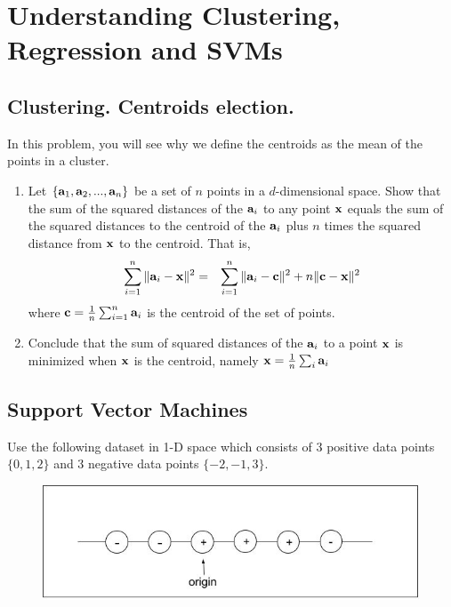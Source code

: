 \section{Understanding Clustering, Regression and SVMs}


\subsection{Clustering. Centroids election.}

In this problem, you will see why we define the centroids as the mean of the points in a cluster.

\begin{enumerate}
    \item Let $\{ {\bf a}_1, {\bf a}_2, ... , {\bf a}_n \}$ be a set of $n$ points in a $d$-dimensional space. Show that the sum of the squared distances of the ${\bf a}_i$ to any point ${\bf x}$ equals the sum of the squared distances to the centroid of the ${\bf a}_i$ plus $n$ times the squared distance from ${\bf x}$ to the centroid. That is,
\begin{eqnarray}
\sum_{i = 1}^n \| {\bf a}_i - {\bf x}\|^2 & = & \sum_{i=1}^{ n} \| {\bf a}_i - {\bf c}\|^2 +  n \| {\bf c} - {\bf x}\|^2
\end{eqnarray}
where ${\bf c} = \frac{1}{ n} \sum_{i=1}^n {\bf a}_i$ is the centroid of the set of points.

\item Conclude that the sum of squared distances of the ${\bf a}_i$ to a point ${\bf x}$ is minimized when ${\bf x}$ is the centroid, namely ${\bf x} = \frac{1}{n} \sum_{i} {\bf a}_i$

\end{enumerate}

\subsection{Support Vector Machines}

Use the following dataset in 1-D space which consists of 3 positive data points $\{0, 1, 2\}$ and 3 negative data points $\{ -2, -1, 3\}$.

\begin{figure}[h!]
    \centering
    \includegraphics[trim ={0 0 0 0 }, scale=0.4]{figs/problem1.jpg}
    \label{face_example}
\end{figure}

